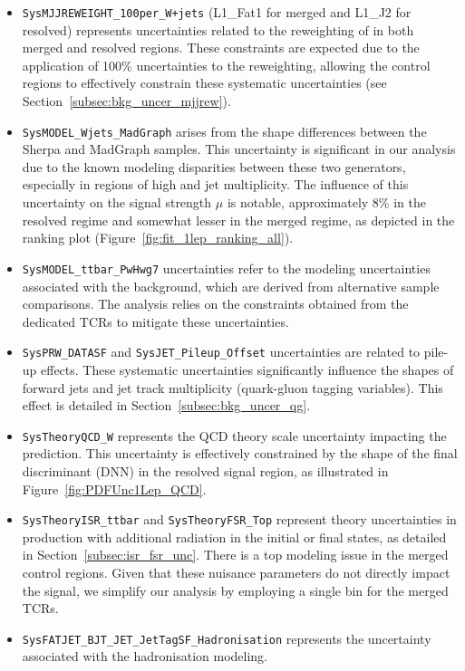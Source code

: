 \begin{itemize}

\item \texttt{SysMJJREWEIGHT\_100per\_W+jets} (L1\_Fat1 for merged and L1\_J2 for resolved) 
represents uncertainties related to the reweighting of \mjjtag in both merged and resolved regions. These constraints are expected due to the application of 100\% uncertainties to the \mjjtag reweighting, allowing the control regions to effectively constrain these systematic uncertainties (see Section~\ref{subsec:bkg_uncer_mjjrew}).

\item \texttt{SysMODEL\_Wjets\_MadGraph} 
arises from the shape differences between the Sherpa and MadGraph samples. This uncertainty is significant in our analysis due to the known modeling disparities between these two generators, especially in regions of high \mjjtag and jet multiplicity. The influence of this uncertainty on the signal strength $\mu$ is notable, approximately $8\%$ in the resolved regime and somewhat lesser in the merged regime, as depicted in the ranking plot (Figure~\ref{fig:fit_1lep_ranking_all}).

\item \texttt{SysMODEL\_ttbar\_PwHwg7} 
uncertainties refer to the modeling uncertainties associated with the \ttbar background, which are derived from alternative sample comparisons. The analysis relies on the constraints obtained from the dedicated TCRs to mitigate these uncertainties.

\item \texttt{SysPRW\_DATASF} and \texttt{SysJET\_Pileup\_Offset} 
uncertainties are related to pile-up effects. These systematic uncertainties significantly influence the shapes of forward jets and jet track multiplicity (quark-gluon tagging variables). This effect is detailed in Section~\ref{subsec:bkg_uncer_qg}.

\item \texttt{SysTheoryQCD\_W} 
represents the QCD theory scale uncertainty impacting the \Wjets prediction. This uncertainty is effectively constrained by the shape of the final discriminant (DNN) in the resolved signal region, as illustrated in Figure~\ref{fig:PDFUnc1Lep_QCD}.

\item \texttt{SysTheoryISR\_ttbar} and \texttt{SysTheoryFSR\_Top} 
represent theory uncertainties in \ttbar production with additional radiation in the initial or final states, as detailed in Section~\ref{subsec:isr_fsr_unc}. There is a top modeling issue in the merged control regions. Given that these nuisance parameters do not directly impact the signal, we simplify our analysis by employing a single bin for the merged TCRs.

\item \texttt{SysFATJET\_BJT\_JET\_JetTagSF\_Hadronisation} represents the uncertainty associated with the hadronisation modeling.

\end{itemize}


